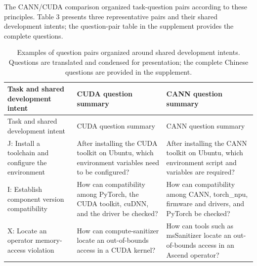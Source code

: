 \documentclass[manuscript,review,anonymous]{acmart}
\begin{document}
The CANN/CUDA comparison organized task-question pairs according to these principles. Table 3 presents three representative pairs and their shared development intents; the question-pair table in the supplement provides the complete questions.

\begin{longtable}[]{@{}
  >{\raggedright\arraybackslash}p{}
  >{\raggedright\arraybackslash}p{}
  >{\raggedright\arraybackslash}p{}@{}}
\caption{Examples of question pairs organized around shared development intents. Questions are translated and condensed for presentation; the complete Chinese questions are provided in the supplement.}\tabularnewline
\toprule\noalign{}
\begin{minipage}[b]{\linewidth}\raggedright
Task and shared development intent
\end{minipage} & \begin{minipage}[b]{\linewidth}\raggedright
CUDA question summary
\end{minipage} & \begin{minipage}[b]{\linewidth}\raggedright
CANN question summary
\end{minipage} \\
\midrule\noalign{}
\endfirsthead
\toprule\noalign{}
\begin{minipage}[b]{\linewidth}\raggedright
Task and shared development intent
\end{minipage} & \begin{minipage}[b]{\linewidth}\raggedright
CUDA question summary
\end{minipage} & \begin{minipage}[b]{\linewidth}\raggedright
CANN question summary
\end{minipage} \\
\midrule\noalign{}
\endhead
\bottomrule\noalign{}
\endlastfoot
J: Install a toolchain and configure the environment & After installing the CUDA toolkit on Ubuntu, which environment variables need to be configured? & After installing the CANN toolkit on Ubuntu, which environment script and variables are required? \\
I: Establish component version compatibility & How can compatibility among PyTorch, the CUDA toolkit, cuDNN, and the driver be checked? & How can compatibility among CANN, torch\_npu, firmware and drivers, and PyTorch be checked? \\
X: Locate an operator memory-access violation & How can compute-sanitizer locate an out-of-bounds access in a CUDA kernel? & How can tools such as msSanitizer locate an out-of-bounds access in an Ascend operator? \\
\end{longtable}
\end{document}
